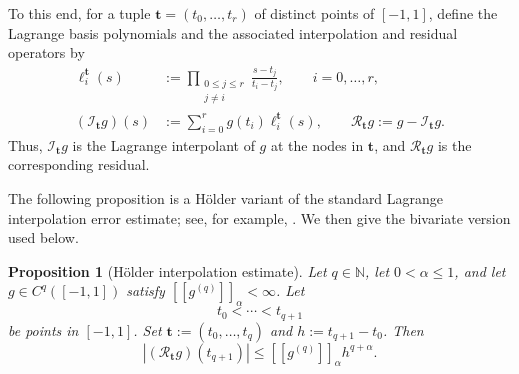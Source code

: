 \documentclass[11pt]{article}
\newtheorem{proposition}[proposition]{Proposition}
\theoremstyle{definition}
\theoremstyle{remark}
\newcommand{\abs}[1]{\left\lvert #1\right\rvert}
\newcommand{\seminorm}[1]{\left[\!\left[ #1\right]\!\right]}
\begin{document}
To this end, for a tuple $\mathbf t=(t_0,\ldots,t_r)$ of distinct points
of $[-1,1]$, define the Lagrange basis polynomials and the associated
interpolation and residual operators by
\[
\begin{aligned}
    \ell_i^{\mathbf t}(s)
    &:=
    \prod_{\substack{0\le j\le r\\j\ne i}}
    \frac{s-t_j}{t_i-t_j},
    \qquad i=0,\ldots,r,\\
    (\mathcal I_{\mathbf t}g)(s)
    &:=
    \sum_{i=0}^r g(t_i)\ell_i^{\mathbf t}(s),
    \qquad
    \mathcal R_{\mathbf t}g
    :=
    g-\mathcal I_{\mathbf t}g.
\end{aligned}
\]
Thus, $\mathcal I_{\mathbf t}g$ is the Lagrange interpolant of $g$ at
the nodes in $\mathbf t$, and $\mathcal R_{\mathbf t}g$ is the
corresponding residual.

The following proposition is a H\"older variant of the standard Lagrange
interpolation error estimate; see, for example,
\cite[Theorem~6.2]{SuliMayers2003}. We then give the bivariate version used
below.

\begin{proposition}[H\"older interpolation estimate]
\label{prop:local-integer-interpolation}
Let $q\in\mathbb N$, let $0<\alpha\le1$, and let
$g\in C^q([-1,1])$ satisfy
$\seminorm{g^{(q)}}_{\alpha}<\infty$. Let
\[
    t_0<\cdots<t_{q+1}
\]
be points in $[-1,1]$. Set
$\mathbf t:=(t_0,\ldots,t_q)$ and $h:=t_{q+1}-t_0$.
Then
\begin{equation*}
    \abs{(\mathcal R_{\mathbf t}g)(t_{q+1})}
    \le
    \seminorm{g^{(q)}}_{\alpha} h^{q+\alpha}.
\end{equation*}
\end{proposition}
\end{document}
